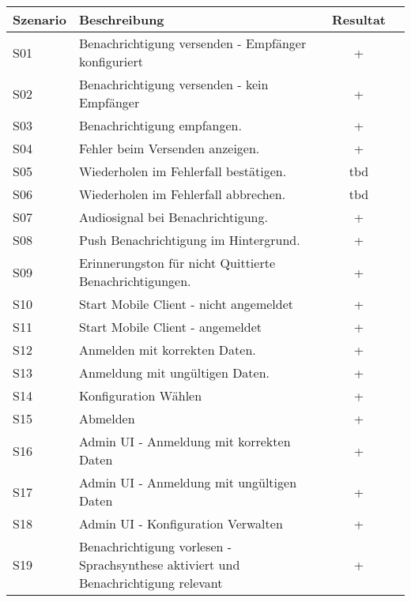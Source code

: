 \begin{table}[h]
    \centering
    \begin{tabular}{|l|p{11cm}|c|c|}
        \hline
        \textbf{Szenario} & \textbf{Beschreibung} & \textbf{Resultat} \\
        \hline
        S01         & Benachrichtigung versenden - Empfänger konfiguriert   & +\\
        \hline
        S02         & Benachrichtigung versenden - kein Empfänger & +\\
        \hline
        S03         & Benachrichtigung empfangen.  & +\\
        \hline
        S04         & Fehler beim Versenden anzeigen.  & +\\
        \hline
        S05         & Wiederholen im Fehlerfall bestätigen.  & tbd\\
        \hline
        S06         & Wiederholen im Fehlerfall abbrechen.  & tbd\\
        \hline
        S07         & Audiosignal bei Benachrichtigung.   & +\\
        \hline
        S08         & Push Benachrichtigung im Hintergrund.  & +\\
        \hline
        S09         & Erinnerungston für nicht Quittierte Benachrichtigungen.   & +\\
        \hline
        S10         & Start Mobile Client - nicht angemeldet   & +\\
        \hline
        S11         & Start Mobile Client  - angemeldet & +\\
        \hline
        S12         & Anmelden mit korrekten Daten.   & +\\
        \hline
        S13         & Anmeldung mit ungültigen Daten.   & +\\
        \hline
        S14         & Konfiguration Wählen   & +\\
        \hline
        S15         & Abmelden   & +\\
        \hline
        S16         & Admin UI - Anmeldung mit korrekten Daten   & +\\
        \hline
        S17         & Admin UI - Anmeldung mit ungültigen Daten   & +\\
        \hline
        S18         & Admin UI - Konfiguration Verwalten   & +\\
        \hline
        S19         & Benachrichtigung vorlesen - Sprachsynthese aktiviert und Benachrichtigung relevant & +\\

\end{tabular}
\end{table}
